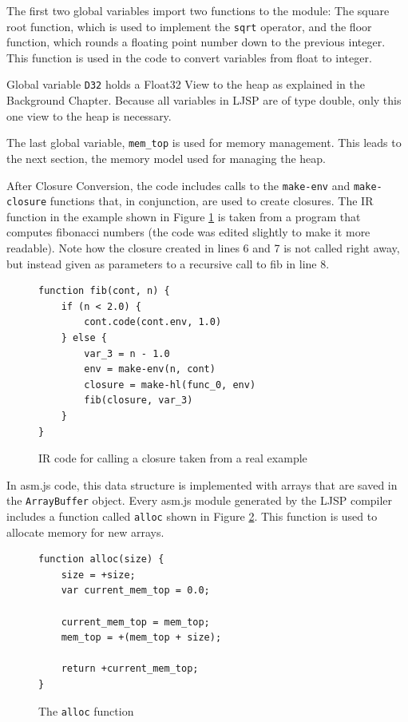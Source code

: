 \documentclass[11pt]{report}
\begin{document}
The first two global variables import two functions to the module: The square root function, which is used to implement the \texttt{sqrt} operator, and the floor function, which rounds a floating point number down to the previous integer. This function is used in the code to convert variables from float to integer.

Global variable \texttt{D32} holds a Float32 View to the heap as explained in the Background Chapter. Because all variables in LJSP are of type double, only this one view to the heap is necessary.

The last global variable, \texttt{mem_top} is used for memory management. This leads to the next section, the memory model used for managing the heap.

After Closure Conversion, the code includes calls to the \texttt{make-env} and \texttt{make-closure} functions that, in conjunction, are used to create closures.  The IR function in the example shown in Figure \ref{iasmjsmm2} is taken from a program that computes fibonacci numbers (the code was edited slightly to make it more readable). Note how the closure created in lines 6 and 7 is not called right away, but instead given as parameters to a recursive call to fib in line 8.

\begin{figure}[ht]
\begin{lstlisting}
function fib(cont, n) {
    if (n < 2.0) {
        cont.code(cont.env, 1.0)
    } else {
        var_3 = n - 1.0
        env = make-env(n, cont)
        closure = make-hl(func_0, env)
        fib(closure, var_3)
    }
}
\end{lstlisting}
\caption{IR code for calling a closure taken from a real example}
\label{iasmjsmm2}
\end{figure}

In asm.js code, this data structure is implemented with arrays that are saved in the \texttt{ArrayBuffer} object. Every asm.js module generated by the LJSP compiler includes a function called \texttt{alloc} shown in Figure \ref{iasmjsmm3}. This function is used to allocate memory for new arrays.

\begin{figure}[ht]
\begin{lstlisting}
function alloc(size) {
    size = +size;
    var current_mem_top = 0.0;

    current_mem_top = mem_top;
    mem_top = +(mem_top + size);

    return +current_mem_top;
}
\end{lstlisting}
\caption{The \texttt{alloc} function}
\label{iasmjsmm3}
\end{figure}
\end{document}
